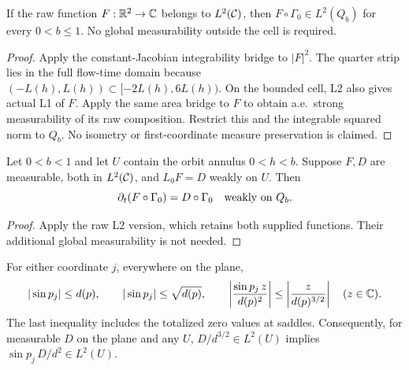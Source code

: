 \begin{lemma}
\label{lem:quarter-l2-pullback}
\leanok
If the raw function $F:\mathbb{R}^2\to\mathbb{C}$ belongs to $L^2(\mathcal{C})$, then
$F\circ\Gamma_0\in L^2(Q_b)$ for every $0<b\le1$.
No global measurability outside the cell is required.
\end{lemma}

\begin{proof}
\leanok
Apply the constant-Jacobian integrability bridge to $|F|^2$.
The quarter strip lies in the full flow-time domain because
$(-L(h),L(h))\subset[-2L(h),6L(h))$.
On the bounded cell, L2 also gives actual L1 of $F$. Apply the same
area bridge to $F$ to obtain a.e.\ strong measurability of its raw
composition. Restrict this and the integrable squared norm to $Q_b$.
No isometry or first-coordinate measure preservation is claimed.
\end{proof}

\begin{lemma}
\label{lem:quarter-time-pullback}
\leanok
Let $0<b<1$ and let $U$ contain the orbit annulus $0<h<b$.
Suppose $F,D$ are measurable, both in $L^2(\mathcal{C})$, and
$L_0F=D$ weakly on $U$. Then
\[
 \partial_t(F\circ\Gamma_0)=D\circ\Gamma_0
 \quad\hbox{weakly on }Q_b.
\]
\end{lemma}

\begin{proof}
\leanok
Apply the raw L2 version, which retains both supplied functions.
Their additional global measurability is not needed.
\end{proof}

\begin{lemma}
\label{lem:saddle-transport-weights}
\leanok
For either coordinate $j$, everywhere on the plane,
\[
 |\sin p_j|\le d(p),\qquad |\sin p_j|\le\sqrt{d(p)},\qquad
 \left|\frac{\sin p_j\,z}{d(p)^2}\right|
 \le\left|\frac{z}{d(p)^{3/2}}\right|\quad(z\in\mathbb{C}).
\]
The last inequality includes the totalized zero values at saddles.
Consequently, for measurable $D$ on the plane and any $U$,
$D/d^{3/2}\in L^2(U)$ implies $\sin p_j\,D/d^2\in L^2(U)$.
\end{lemma}

